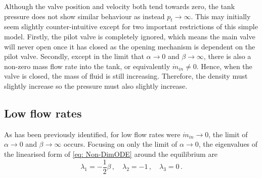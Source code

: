 Although the valve position and velocity both tend towards zero, the tank pressure does not show similar behaviour as instead $p_t \rightarrow \infty$. This may initially seem slightly counter-intuitive except for two important restrictions of this simple model. Firstly, the pilot valve is completely ignored, which means the main valve will never open once it has closed as the opening mechanism is dependent on the pilot valve. Secondly, except in the limit that $\alpha \rightarrow 0$ and $\beta \rightarrow \infty$, there is also a non-zero mass flow rate into the tank, or equivalently $\dot{m}_{in} \neq 0$. Hence, when the valve is closed, the mass of fluid is still increasing. Therefore, the density must slightly increase so the pressure must also slightly increase.




\subsection{Low flow rates}

As has been previously identified, for low flow rates were $\dot{m}_{in} \rightarrow 0$, the limit of $\alpha \rightarrow 0$ and $\beta \rightarrow \infty$ occurs. Focusing on only the limit of $\alpha \rightarrow 0$, the eigenvalues of the linearised form of \cref{eq: Non-DimODE} around the equilibrium are
~ %
\begin{equation*}
    \lambda_1 = - \frac{1}{2}\beta \, , \quad
    \lambda_2 = -1 \, , \quad
    \lambda_3 = 0 \, .
\end{equation*}

